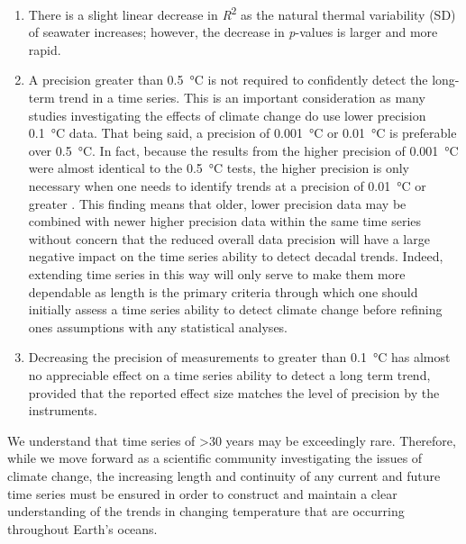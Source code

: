 \documentclass{ametsoc}
\begin{document}
\begin{enumerate}
\item There is a slight linear decrease in \emph{R}\textsuperscript{2} as the natural thermal variability (SD) of seawater increases; however, the decrease in \emph{p}-values is larger and more rapid.

\item A precision greater than \SI{0.5}{\degreeCelsius} is not required to confidently detect the long-term trend in a time series. This is an important consideration as many studies investigating the effects of climate change \citep[e.g.][]{Grant2010, Scherrer2010, Lathlean2012} do use lower precision \SI{0.1}{\degreeCelsius} data. That being said, a precision of \SI{0.001}{\degreeCelsius} or \SI{0.01}{\degreeCelsius} is preferable over \SI{0.5}{\degreeCelsius}. In fact, because the results from the higher precision of \SI{0.001}{\degreeCelsius} were almost identical to the \SI{0.5}{\degreeCelsius} tests, the higher precision is only necessary when one needs to identify trends at a precision of \SI{0.01}{\degreeCelsius} or greater \citep{Karl2015}. This finding means that older, lower precision data may be combined with newer higher precision data within the same time series without concern that the reduced overall data precision will have a large negative impact on the time series ability to detect decadal trends. Indeed, extending time series in this way will only serve to make them more dependable as length is the primary criteria through which one should initially assess a time series ability to detect climate change before refining ones assumptions with any statistical analyses.

\item Decreasing the precision of measurements to greater than \SI{0.1}{\degreeCelsius} has almost no appreciable effect on a time series ability to detect a long term trend, provided that the reported effect size matches the level of precision by the instruments.
\end{enumerate}

We understand that time series of >30 years may be exceedingly rare. Therefore, while we move forward as a scientific community investigating the issues of climate change, the increasing length and continuity of any current and future time series must be ensured in order to construct and maintain a clear understanding of the trends in changing temperature that are occurring throughout Earth's oceans.

%
\end{document}

